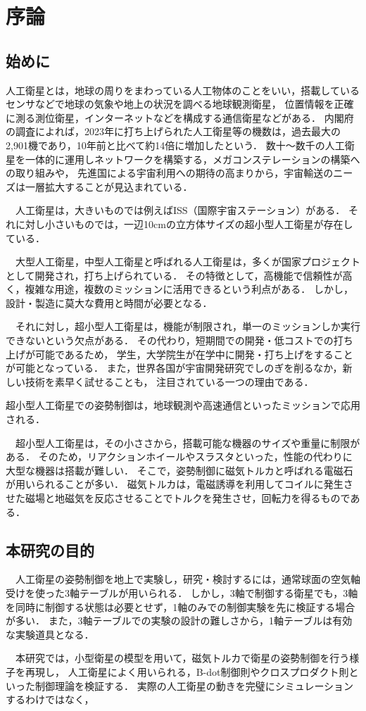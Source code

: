 \section{序論}
\subsection{始めに}
人工衛星とは，地球の周りをまわっている人工物体のことをいい，搭載しているセンサなどで地球の気象や地上の状況を調べる地球観測衛星，
位置情報を正確に測る測位衛星，インターネットなどを構成する通信衛星などがある．
内閣府の調査によれば，2023年に打ち上げられた人工衛星等の機数は，過去最大の2,901機であり，10年前と比べて約14倍に増加したという．
数十～数千の人工衛星を一体的に運用しネットワークを構築する，メガコンステレーションの構築への取り組みや，
先進国による宇宙利用への期待の高まりから，宇宙輸送のニーズは一層拡大することが見込まれている．

　人工衛星は，大きいものでは例えばISS（国際宇宙ステーション）がある．
それに対し小さいものでは，一辺10cmの立方体サイズの超小型人工衛星が存在している．

　大型人工衛星，中型人工衛星と呼ばれる人工衛星は，多くが国家プロジェクトとして開発され，打ち上げられている．
その特徴として，高機能で信頼性が高く，複雑な用途，複数のミッションに活用できるという利点がある．
しかし，設計・製造に莫大な費用と時間が必要となる．

　それに対し，超小型人工衛星は，機能が制限され，単一のミッションしか実行できないという欠点がある．
その代わり，短期間での開発・低コストでの打ち上げが可能であるため，
学生，大学院生が在学中に開発・打ち上げをすることが可能となっている．
また，世界各国が宇宙開発研究でしのぎを削るなか，新しい技術を素早く試せることも，
注目されている一つの理由である．

超小型人工衛星での姿勢制御は，地球観測や高速通信といったミッションで応用される．

　超小型人工衛星は，その小ささから，搭載可能な機器のサイズや重量に制限がある．
そのため，リアクションホイールやスラスタといった，性能の代わりに大型な機器は搭載が難しい．
そこで，姿勢制御に磁気トルカと呼ばれる電磁石が用いられることが多い．
磁気トルカは，電磁誘導を利用してコイルに発生させた磁場と地磁気を反応させることでトルクを発生させ，回転力を得るものである．



\subsection{本研究の目的}
　人工衛星の姿勢制御を地上で実験し，研究・検討するには，通常球面の空気軸受けを使った3軸テーブルが用いられる．
しかし，3軸で制御する衛星でも，3軸を同時に制御する状態は必要とせず，1軸のみでの制御実験を先に検証する場合が多い．
また，3軸テーブルでの実験の設計の難しさから，1軸テーブルは有効な実験道具となる．

　本研究では，小型衛星の模型を用いて，磁気トルカで衛星の姿勢制御を行う様子を再現し，
人工衛星によく用いられる，B-dot制御則やクロスプロダクト則といった制御理論を検証する．
実際の人工衛星の動きを完璧にシミュレーションするわけではなく，

